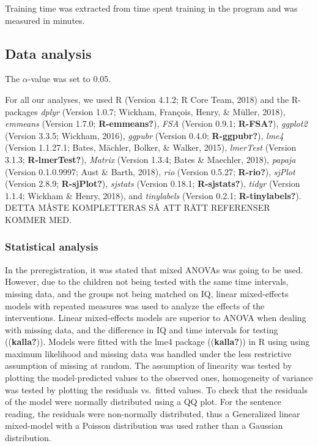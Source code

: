 \documentclass[
  english,
  ,man]{apa6}
\begin{document}
Training time was extracted from time spent training in the program and was measured in minutes.

\hypertarget{data-analysis}{%
\subsection{Data analysis}\label{data-analysis}}

The \(\alpha\)-value was set to 0.05.

For all our analyses, we used R (Version 4.1.2; R Core Team, 2018) and the R-packages \emph{dplyr} (Version 1.0.7; Wickham, François, Henry, \& Müller, 2018), \emph{emmeans} (Version 1.7.0; \textbf{R-emmeans?}), \emph{FSA} (Version 0.9.1; \textbf{R-FSA?}), \emph{ggplot2} (Version 3.3.5; Wickham, 2016), \emph{ggpubr} (Version 0.4.0; \textbf{R-ggpubr?}), \emph{lme4} (Version 1.1.27.1; Bates, Mächler, Bolker, \& Walker, 2015), \emph{lmerTest} (Version 3.1.3; \textbf{R-lmerTest?}), \emph{Matrix} (Version 1.3.4; Bates \& Maechler, 2018), \emph{papaja} (Version 0.1.0.9997; Aust \& Barth, 2018), \emph{rio} (Version 0.5.27; \textbf{R-rio?}), \emph{sjPlot} (Version 2.8.9; \textbf{R-sjPlot?}), \emph{sjstats} (Version 0.18.1; \textbf{R-sjstats?}), \emph{tidyr} (Version 1.1.4; Wickham \& Henry, 2018), and \emph{tinylabels} (Version 0.2.1; \textbf{R-tinylabels?}). DETTA MÅSTE KOMPLETTERAS SÅ ATT RÄTT REFERENSER KOMMER MED.

\hypertarget{statistical-analysis}{%
\subsubsection{Statistical analysis}\label{statistical-analysis}}

In the preregistration, it was stated that mixed ANOVAs was going to be used. However, due to the children not being tested with the same time intervals, missing data, and the groups not being matched on IQ, linear mixed-effects models with repeated measures was used to analyze the effects of the interventions. Linear mixed-effects models are superior to ANOVA when dealing with missing data, and the difference in IQ and time intervals for testing ((\textbf{kalla?})). Models were fitted with the lme4 package ((\textbf{kalla?})) in R using using maximum likelihood and missing data was handled under the less restrictive assumption of missing at random. The assumption of linearity was tested by plotting the model-predicted values to the observed ones, homogeneity of variance was tested by plotting the residuals vs.~fitted values. To check that the residuals of the model were normally distributed using a QQ plot. For the sentence reading, the residuals were non-normally distributed, thus a Generalized linear mixed-model with a Poisson distribution was used rather than a Gaussian distribution.
\end{document}
